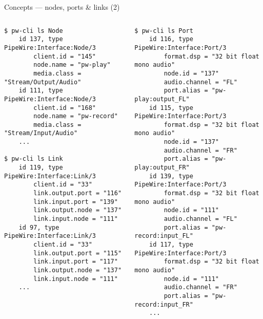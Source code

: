 \begin{frame}[fragile]{Concepts — nodes, ports \& links (2)}

  \begin{columns}

      \begin{block}{}
        \fontsize{8}{8}\selectfont
          \begin{verbatim}
$ pw-cli ls Node
    id 137, type PipeWire:Interface:Node/3
        client.id = "145"
        node.name = "pw-play"
        media.class = "Stream/Output/Audio"
    id 111, type PipeWire:Interface:Node/3
        client.id = "168"
        node.name = "pw-record"
        media.class = "Stream/Input/Audio"
    ...

$ pw-cli ls Link
    id 119, type PipeWire:Interface:Link/3
        client.id = "33"
        link.output.port = "116"
        link.input.port = "139"
        link.output.node = "137"
        link.input.node = "111"
    id 97, type PipeWire:Interface:Link/3
        client.id = "33"
        link.output.port = "115"
        link.input.port = "117"
        link.output.node = "137"
        link.input.node = "111"
    ...
          \end{verbatim}
        \end{block}


      \begin{block}{}
        \fontsize{8}{8}\selectfont
          \begin{verbatim}
$ pw-cli ls Port
    id 116, type PipeWire:Interface:Port/3
        format.dsp = "32 bit float mono audio"
        node.id = "137"
        audio.channel = "FL"
        port.alias = "pw-play:output_FL"
    id 115, type PipeWire:Interface:Port/3
        format.dsp = "32 bit float mono audio"
        node.id = "137"
        audio.channel = "FR"
        port.alias = "pw-play:output_FR"
    id 139, type PipeWire:Interface:Port/3
        format.dsp = "32 bit float mono audio"
        node.id = "111"
        audio.channel = "FL"
        port.alias = "pw-record:input_FL"
    id 117, type PipeWire:Interface:Port/3
        format.dsp = "32 bit float mono audio"
        node.id = "111"
        audio.channel = "FR"
        port.alias = "pw-record:input_FR"
    ...
          \end{verbatim}
        \end{block}

  \end{columns}
\end{frame}



